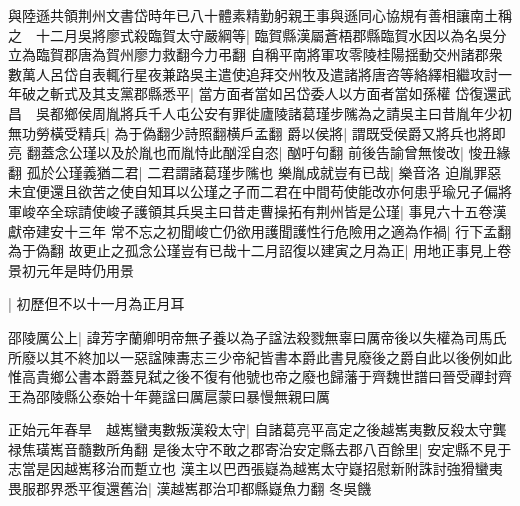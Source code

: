 與陸遜共領荆州文書岱時年已八十體素精勤躬親王事與遜同心協規有善相讓南土稱之　十二月吳將廖式殺臨賀太守嚴綱等|{
	臨賀縣漢屬蒼梧郡縣臨賀水因以為名吳分立為臨賀郡唐為賀州廖力救翻今力弔翻}
自稱平南將軍攻零陵桂陽揺動交州諸郡衆數萬人呂岱自表輒行星夜兼路吳主遣使追拜交州牧及遣諸將唐咨等絡繹相繼攻討一年破之斬式及其支黨郡縣悉平|{
	當方面者當如呂岱委人以方面者當如孫權}
岱復還武昌　吳都鄉侯周胤將兵千人屯公安有罪徙廬陵諸葛瑾步隲為之請吳主曰昔胤年少初無功勞橫受精兵|{
	為于偽翻少詩照翻横戶孟翻}
爵以侯將|{
	謂既受侯爵又將兵也將即亮}
翻蓋念公瑾以及於胤也而胤恃此酗淫自恣|{
	酗吁句翻}
前後告諭曾無悛改|{
	悛丑緣翻}
孤於公瑾義猶二君|{
	二君謂諸葛瑾步隲也}
樂胤成就豈有已哉|{
	樂音洛}
迫胤罪惡未宜便還且欲苦之使自知耳以公瑾之子而二君在中間苟使能改亦何患乎瑜兄子偏將軍峻卒全琮請使峻子護領其兵吳主曰昔走曹操拓有荆州皆是公瑾|{
	事見六十五卷漢獻帝建安十三年}
常不忘之初聞峻亡仍欲用護聞護性行危險用之適為作禍|{
	行下孟翻為于偽翻}
故更止之孤念公瑾豈有已哉十二月詔復以建寅之月為正|{
	用地正事見上卷景初元年是時仍用景}


|{
	初歷但不以十一月為正月耳}


邵陵厲公上|{
	諱芳字蘭卿明帝無子養以為子諡法殺戮無辜曰厲帝後以失權為司馬氏所廢以其不終加以一惡諡陳夀志三少帝紀皆書本爵此書見廢後之爵自此以後例如此惟高貴鄉公書本爵蓋見弑之後不復有他號也帝之廢也歸藩于齊魏世譜曰晉受禪封齊王為邵陵縣公泰始十年薨諡曰厲扈蒙曰暴慢無親曰厲}


正始元年春旱　越嶲蠻夷數叛漢殺太守|{
	自諸葛亮平高定之後越嶲夷數反殺太守龔禄焦璜嶲音髓數所角翻}
是後太守不敢之郡寄治安定縣去郡八百餘里|{
	安定縣不見于志當是因越嶲移治而蹔立也}
漢主以巴西張嶷為越嶲太守嶷招慰新附誅討強猾蠻夷畏服郡界悉平復還舊治|{
	漢越嶲郡治卭都縣嶷魚力翻}
冬吳饑


